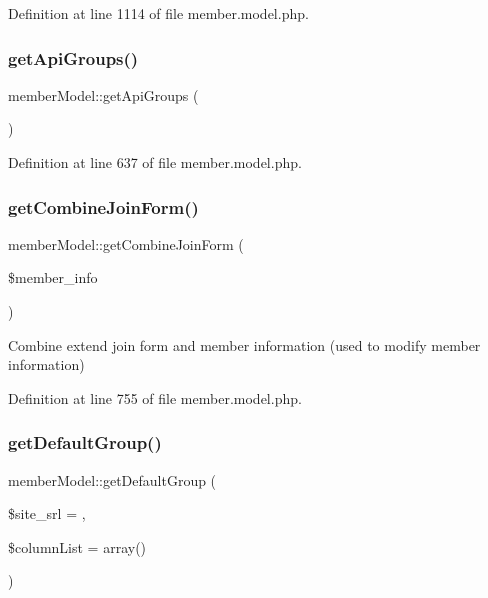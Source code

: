 Definition at line 1114 of file member.\+model.\+php.

\hypertarget{classmemberModel_a7b52f35158a9d2dc8138359fcf120b88}{}\label{classmemberModel_a7b52f35158a9d2dc8138359fcf120b88} 
\subsubsection{\texorpdfstring{get\+Api\+Groups()}{getApiGroups()}}
{\footnotesize\ttfamily member\+Model\+::get\+Api\+Groups (\begin{DoxyParamCaption}{ }\end{DoxyParamCaption})}



Definition at line 637 of file member.\+model.\+php.

\hypertarget{classmemberModel_a0bb14a9030332a0ab996bf545ff77de6}{}\label{classmemberModel_a0bb14a9030332a0ab996bf545ff77de6} 
\subsubsection{\texorpdfstring{get\+Combine\+Join\+Form()}{getCombineJoinForm()}}
{\footnotesize\ttfamily member\+Model\+::get\+Combine\+Join\+Form (\begin{DoxyParamCaption}\item[{}]{\$member\+\_\+info }\end{DoxyParamCaption})}



Combine extend join form and member information (used to modify member information) 



Definition at line 755 of file member.\+model.\+php.

\hypertarget{classmemberModel_ab3b592e1198567e74b72d1ebd9d738bc}{}\label{classmemberModel_ab3b592e1198567e74b72d1ebd9d738bc} 
\subsubsection{\texorpdfstring{get\+Default\+Group()}{getDefaultGroup()}}
{\footnotesize\ttfamily member\+Model\+::get\+Default\+Group (\begin{DoxyParamCaption}\item[{}]{\$site\+\_\+srl = {},  }\item[{}]{\$column\+List = {\ttfamily array()} }\end{DoxyParamCaption})}



